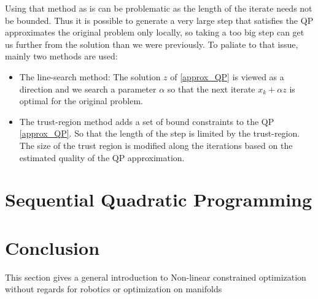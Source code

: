 Using that method as is can be problematic as the length of the iterate needs not be bounded.
Thus it is possible to generate a very large step that satisfies the QP approximates the original problem only locally, so taking a too big step can get us further from the solution than we were previously.
To paliate to that issue, mainly two methods are used:
\begin{itemize}
  \item The line-search method: The solution $z$ of \ref{approx_QP} is viewed as a direction and we search a parameter $\alpha$ so that the next iterate $x_k + \alpha z$ is optimal for the original problem.
  \item The trust-region method adds a set of bound constraints to the QP \ref{approx_QP}. So that the length of the step is limited by the trust-region. The size of the trust region is modified along the iterations based on the estimated quality of the QP approximation.
\end{itemize}

\section{Sequential Quadratic Programming}
\label{sec:sequential_quadratic_programming}




\section{Conclusion}
This section gives a general introduction to Non-linear constrained optimization without regards for robotics or optimization on manifolds

